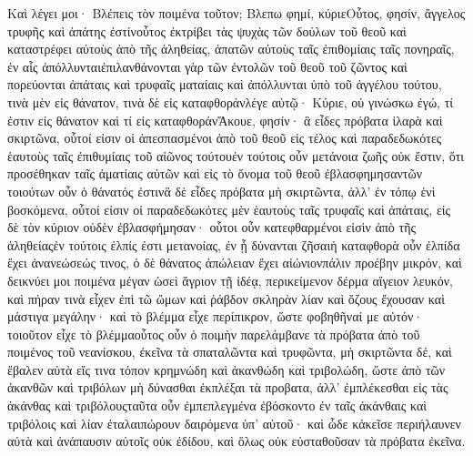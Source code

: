 Καὶ λέγει μοι· Βλέπεις τὸν ποιμένα τοῦτον; Βλεπω φημί, κύριεΟὗτος, φησίν, ἄγγελος τρυφῆς καὶ ἀπάτης ἐστίνοὗτος ἐκτρίβει τὰς ψυχὰς τῶν δούλων τοῦ θεοῦ καὶ καταστρέφει αὐτοὺς ἀπὸ τῆς ἀληθείας, ἀπατῶν αὐτοὺς ταῖς ἐπιθομίαις ταῖς πονηραῖς, ἐν αἷς ἀπόλλυνταιἐπιλανθάνονται γὰρ τῶν ἐντολῶν τοῦ θεοῦ τοῦ ζῶντος καὶ πορεύονται ἀπάταις καὶ τρυφαῖς ματαίαις καὶ ἀπόλλυνται ὑπὸ τοῦ ἀγγέλου τούτου, τινὰ μὲν εἰς θάνατον, τινὰ δὲ εἰς καταφθοράνλέγε αὐτῷ· Κύριε, οὐ γινώσκω ἐγώ, τί ἐστιν εἰς θάνατον καὶ τί εἰς καταφθοράνἌκουε, φησίν· ἃ εἶδες πρόβατα ἱλαρὰ καὶ σκιρτῶνα, οὗτοί εἰσιν οἱ ἀπεσπασμένοι ἀπὸ τοῦ θεοῦ εἰς τέλος καὶ παραδεδωκότες ἑαυτοὺς ταῖς ἐπιθυμίαις τοῦ αἰῶνος τούτουἐν τούτοις οὖν μετάνοια ζωῆς οὐκ ἔστιν, ὅτι προσέθηκαν ταῖς ἁματίαις αὐτῶν καὶ εἰς τὸ ὄνομα τοῦ θεοῦ ἐβλασφημησαντῶν τοιούτων οὖν ὁ θάνατός ἐστινἃ δὲ εἶδες πρόβατα μὴ σκιρτῶντα, ἀλλ’ ἐν τόπῳ ἑνὶ βοσκόμενα, οὗτοί εἰσιν οἱ παραδεδωκότες μὲν ἑαυτοὺς ταῖς τρυφαῖς καὶ ἀπάταις, εἰς δὲ τὸν κύριον οὐδὲν ἐβλασφήμησαν· οὗτοι οὖν κατεφθαρμένοι εἰσὶν ἀπὸ τῆς ἀληθείαςἐν τούτοις ἐλπίς ἐστι μετανοίας, ἐν ᾗ δύνανται ζῆσαιἡ καταφθορὰ οὖν ἐλπίδα ἔχει ἀνανεώσεώς τινος, ὁ δὲ θάνατος ἀπώλειαν ἔχει αἰώνιονπάλιν προέβην μικρόν, καὶ δεικνύει μοι ποιμένα μέγαν ὡσεὶ ἄγριον τῇ ἰδέᾳ, περικείμενον δέρμα αἴγειον λευκόν, καὶ πήραν τινὰ εἶχεν ἐπὶ τῶ ὤμων καὶ ῥάβδον σκληρὰν λίαν καὶ ὄζους ἔχουσαν καὶ μάστιγα μεγάλην· καὶ τὸ βλέμμα εἶχε περίπικρον, ὥστε φοβηθῆναί με αὐτόν· τοιοῦτον εἶχε τὸ βλέμμαοὗτος οὖν ὁ ποιμὴν παρελάμβανε τὰ πρόβατα ἀπὸ τοῦ ποιμένος τοῦ νεανίσκου, ἐκεῖνα τὰ σπαταλῶντα καὶ τρυφῶντα, μὴ σκιρτῶντα δέ, καὶ ἔβαλεν αὐτὰ εἴς τινα τόπον κρημνώδη καὶ ἀκανθώδη καὶ τριβολώδη, ὥστε ἀπὸ τῶν ἀκανθῶν καὶ τριβόλων μὴ δύνασθαι ἐκπλέξαι τὰ προβατα, ἀλλ’ ἐμπλέκεσθαι εἰς τὰς ἀκάνθας καὶ τριβόλουςταῦτα οὖν ἐμπεπλεγμένα ἐβόσκοντο ἐν ταῖς ἀκάνθαις καὶ τριβόλοις καὶ λίαν ἐταλαιπώρουν δαιρόμενα ὑπ’ αὐτοῦ· καὶ ὧδε κἀκεῖσε περιήλαυνεν αὐτὰ καὶ ἀνάπαυσιν αὐτοῖς οὐκ ἐδίδου, καὶ ὅλως οὐκ εὐσταθοῦσαν τὰ πρόβατα ἐκεῖνα.
